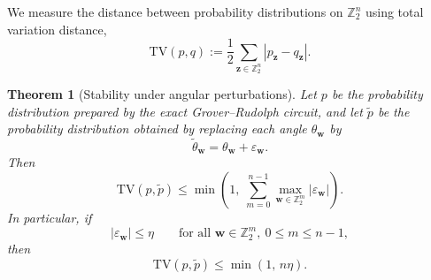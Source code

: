 \documentclass{article}
\newtheorem{theorem}{Theorem}[section]
\numberwithin{equation}{section}
\begin{document}
We measure the distance between probability distributions on
\(\mathbb Z_2^n\) using total variation distance,
\[
\mathrm{TV}(p,q)
:=
\frac12
\sum_{\mathbf z\in\mathbb Z_2^n}
|p_{\mathbf z}-q_{\mathbf z}|.
\]

\begin{theorem}[Stability under angular perturbations]
\label{thm:gr_angle_stability}
Let \(p\) be the probability distribution prepared by the exact
Grover--Rudolph circuit, and let \(\widetilde p\) be the probability
distribution obtained by replacing each angle
\(\theta_{\mathbf w}\) by
\[
\widetilde\theta_{\mathbf w}
=
\theta_{\mathbf w}
+
\varepsilon_{\mathbf w}.
\]
Then
\[
\mathrm{TV}(p,\widetilde p)
\le
\min\!\left(1,\;
\sum_{m=0}^{n-1}
\max_{\mathbf w\in\mathbb Z_2^m}
|\varepsilon_{\mathbf w}|\right).
\]
In particular, if
\[
|\varepsilon_{\mathbf w}|\le \eta
\qquad
\text{for all }
\mathbf w\in\mathbb Z_2^m,\ 0\le m\le n-1,
\]
then
\[
\mathrm{TV}(p,\widetilde p)
\le
\min(1,\,n\eta).
\]
\end{theorem}
\end{document}
